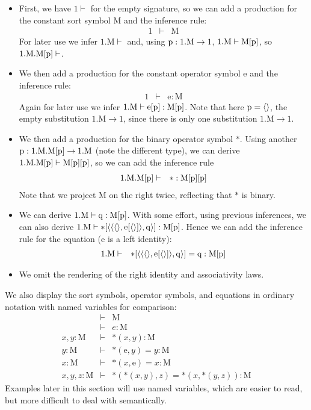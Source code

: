 \documentclass{lmcs}
\def\Mon{\mathrm{M}}
\def\idmon{\mathrm{e}}
\def\comp{\mathrm{*}}
\begin{document}
\begin{itemize}
\item 
First, we have $1 \vdash$ for the empty signature, so we can 
add a production for the constant sort symbol $\Mon$ and the inference rule:
\begin{eqnarray*}
1 &\vdash& \Mon
\end{eqnarray*}
For later use we infer $1.\Mon \vdash$ and, using $\p:1.\Mon \to 1$, $1.\Mon\vdash\Mon[\p]$,
so $1.\Mon.\Mon[\p] \vdash$.
\item
We then add a production for the constant operator symbol $\idmon$ and the inference rule:
\begin{eqnarray*}
1 &\vdash& \idmon : \Mon
\end{eqnarray*}
Again for later use we infer $1.\Mon\vdash \idmon[\p] :\Mon[\p]$.
Note that here $\mathrm{p} = \langle  \rangle$, the empty substitution $1.\Mon \to 1$,
since there is only one substitution $1.\Mon \to 1$.
\item
We then add a production for the binary operator symbol $\comp$. 
Using another $\p: 1.\Mon.\Mon[\p] \to 1.\Mon$ (note the different type), 
we can derive $1.\Mon.\Mon[\p] \vdash \Mon[\p][\p]$, so we can add the inference rule
\begin{eqnarray*}
1.\Mon.\Mon[\p] &\vdash& \comp : \Mon[\p][\p]
\end{eqnarray*}
Note that we project $\Mon$ on the right twice, reflecting that $\comp$ is binary.
\item
We can derive $1.\Mon \vdash \q : \Mon[\p]$. With some effort,
using previous inferences, we can also derive 
$1.\Mon \vdash \comp[\tuple{\tuple{\tuple{},\idmon[\tuple{}]},\q}] : \Mon[\p]$.
Hence we can add the inference rule for the equation ($\idmon$ is a left identity):
\begin{eqnarray*}
1.\Mon &\vdash& \comp[\tuple{\tuple{\tuple{},\idmon[\tuple{}]},\q}] = \q : \Mon[\p]
\end{eqnarray*}
\item
We omit the rendering of the right identity and associativity laws.
\end{itemize}

We also display the sort symbols, operator symbols, 
and equations in ordinary notation with named variables for comparison:
\begin{eqnarray*}
&\vdash& \Mon\\
&\vdash& e : \Mon\\
x, y : \Mon &\vdash& \comp(x,y) : \Mon\\
y : \Mon &\vdash& \comp(\idmon,y) = y : \Mon\\
x : \Mon &\vdash& \comp(x,\idmon) = x : \Mon\\
x, y, z : \Mon &\vdash& \comp(\comp(x,y),z) = \comp(x,\comp(y,z)) : \Mon
\end{eqnarray*}
Examples later in this section will use named variables,
which are easier to read, but more difficult to deal with semantically.
\end{document}
